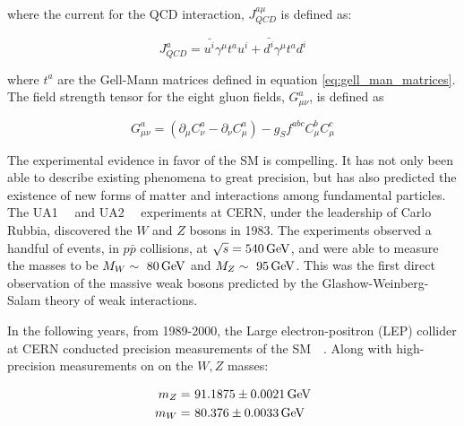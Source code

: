 \noindent where the current for the QCD interaction, $J_{QCD}^{a\mu}$
is defined as:

\begin{equation}\label{eq:sm_qcd_current}
J_{QCD}^{a} = \bar{u^{i}}\gamma^{\mu}t^{a}u^{i} + \bar{d^{i}}\gamma^{\mu}t^{a}d^{i}
\end{equation}

\noindent where $t^{a}$ are the Gell-Mann matrices defined in equation
\ref{eq:gell_man_matrices}.  The field strength tensor for the eight gluon fields,
$G_{\mu\nu}^{a}$, is defined as

\begin{equation}\label{eq:sm_gluon_field_strength_tensor}
G_{\mu\nu}^{a} = (\partial_{\mu}C_{\nu}^{a}
- \partial_{\nu}C_{\mu}^{a}) - g_{S}f^{abc}C_{\mu}^{b}C_{\mu}^{c}  
\end{equation} 

\par The experimental evidence in favor of the SM is compelling.
It has not only been able to describe existing phenomena to great
precision, but has also predicted the existence of new forms of matter
and interactions among fundamental particles.  The
UA1~\cite{ex:UA1_W}~\cite{ex:UA1_Z} and UA2~\cite{ex:UA2_W}~\cite{ex:UA2_Z}
experiments at CERN, under the leadership of Carlo Rubbia, discovered
the $W$ and $Z$ bosons in 1983.  The experiments observed a handful of
events, in $p\bar{p}$ collisions, at $\sqrt{s}=540\,\text{Ge\hspace{-.08em}V}$, and were able
to measure the masses to be $M_{W}\sim~80\,\text{Ge\hspace{-.08em}V}$ and
$M_{Z}\sim~95\,\text{Ge\hspace{-.08em}V}$.  This was the first direct observation of the
massive weak bosons predicted by the Glashow-Weinberg-Salam theory of
weak interactions.  

\par In the following years, from 1989-2000, the Large
electron-positron (LEP) collider at CERN conducted precision measurements of
the SM~\cite{ex:LEP_Z-Pole}~\cite{ex:LEP-2_W}.  Along with
high-precision measurements on on the $W,Z$ masses:

\begin{equation}\label{eq:lep_WZ_masses}
\begin{aligned}
m_{Z} =&~ 91.1875 \pm 0.0021\,\text{Ge\hspace{-.08em}V} \\
m_{W} =&~ 80.376 \pm 0.0033\,\text{Ge\hspace{-.08em}V} 
\end{aligned}
\end{equation}  

